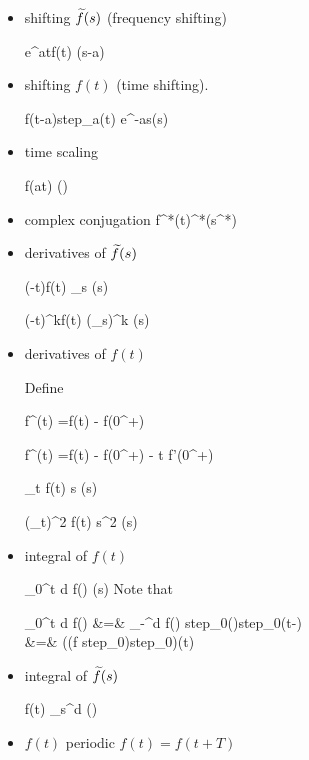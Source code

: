 \begin{itemize}
\item shifting ${\widetilde{f}}(s)$ (frequency shifting)



\beq
e^{at}f(t)\maparrow{\call} (s-a)
\quad{}
\eeq



\item shifting $f(t)$ (time shifting).



\beq
f(t-a)\;step_a(t)\maparrow{\call}
e^{-as}(s)
\quad{}
\eeq

\item time scaling

\beq
f(at)
\maparrow{\call}
\left(\right)
\quad{}
\eeq


\item complex 
conjugation
\beq
f^*(t)\maparrow{\call}^*(s^*)
\eeq

\item
derivatives of ${\widetilde{f}}(s)$

\beq
(-t)f(t)
\maparrow{\call}
 \partial_s
(s)
\eeq

\beq
(-t)^kf(t)
\maparrow{\call} (\partial_s)^k
(s)
\eeq

\item
derivatives of $f(t)$

Define

\beq
f^{}(t)
=f(t) - 
f(0^+)
\eeq


\beq
f^{}(t)
=f(t) - 
f(0^+) - t f'(0^+)
\eeq

\beq
\partial_t f(t)
\maparrow{\call}
s
(s)
\eeq


\beq
(\partial_t)^2 f(t)
\maparrow{\call}
s^2
(s)
\eeq

\item
integral of $f(t)$

\beq 
\int_0^t d\tau\; f(\tau)
\maparrow{\call}
(s)
\eeq
Note that

\beqa
\int_0^t d\tau\; f(\tau)
&=&
\int_{-\infty}^\infty d\tau\; f(\tau)
step_0(\tau)step_0(t-\tau)
\\
&=&
((f step_0)\circledast  step_0)(t)
\eeqa


\item
integral of ${\widetilde{f}}(s)$

\beq {}f(t)
\maparrow{\call}
\int_s^\infty d\s\; (\s)
\eeq

\item $f(t)$ periodic $f(t)=f(t+T)$


\end{itemize}

